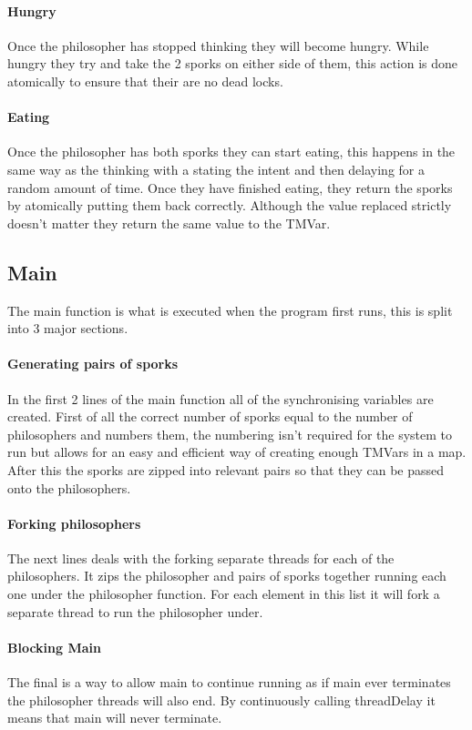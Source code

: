 \documentclass[a4paper]{article}
\begin{document}
\paragraph{Hungry}
Once the philosopher has stopped thinking they will become hungry.
While hungry they try and take the 2 sporks on either side of them, this action is done atomically to ensure that their are no dead locks.

\paragraph{Eating}
Once the philosopher has both sporks they can start eating, this happens in the same way as the thinking with a stating the intent and then delaying for a random amount of time.
Once they have finished eating, they return the sporks by atomically putting them back correctly.
Although the value replaced strictly doesn't matter they return the same value to the TMVar.


\subsection{Main}
The main function is what is executed when the program first runs, this is split into 3 major sections.
\paragraph{Generating pairs of sporks}
In the first 2 lines of the main function all of the synchronising variables are created.
First of all the correct number of sporks equal to the number of philosophers and numbers them, the numbering isn't required for the system to run but allows for an easy and efficient way of creating enough TMVars in a map.
After this the sporks are zipped into relevant pairs so that they can be passed onto the philosophers.
\paragraph{Forking philosophers}
The next lines deals with the forking separate threads for each of the philosophers.
It zips the philosopher and pairs of sporks together running each one under the philosopher function.
For each element in this list it will fork a separate thread to run the philosopher under.
\paragraph{Blocking Main}
The final is a way to allow main to continue running as if main ever terminates the philosopher threads will also end.
By continuously calling threadDelay it means that main will never terminate.

\end{document}

